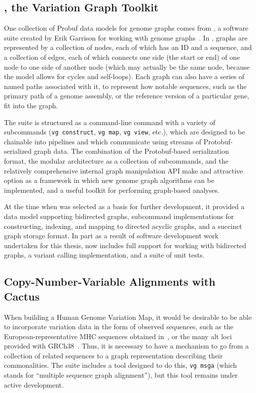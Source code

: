 \subsection{\vg, the Variation Graph Toolkit}


One collection of Probuf data models for genome graphs comes from \vg, a software suite created by Erik Garrison for working with genome graphs~\cite{garrison2016vg}. In \vg, graphs are represented by a collection of nodes, each of which has an ID and a sequence, and a collection of edges, each of which connects one side (the start or end) of one node to one side of another node (which may actually be the same node, because the \vg model allows for cycles and self-loops). Each graph can also have a series of named paths associated with it, to represent how notable sequences, such as the primary path of a genome assembly, or the reference version of a particular gene, fit into the graph.

The \vg suite is structured as a command-line \vg command with a variety of subcommands (\texttt{vg construct}, \texttt{vg map}, \texttt{vg view}, etc.), which are designed to be chainable into pipelines and which communicate using streams of Protobuf-serialized graph data. The combination of the Protobuf-based serialization format, the modular architecture as a collection of subcommands, and the relatively comprehensive internal graph manipulation API make \vg and attractive option as a framework in which new genome graph algorithms can be implemented, and a useful toolkit for performing graph-based analyses.

At the time when \vg was selected as a basis for further development, it provided a data model supporting bidirected graphs, subcommand implementations for constructing, indexing, and mapping to directed acyclic graphs, and a succinct graph storage format. In part as a result of software development work undertaken for this thesis, \vg now includes full support for working with bidirected graphs, a variant calling implementation, and a suite of unit tests.

\subsection{Copy-Number-Variable Alignments with Cactus}

When building a Human Genome Variation Map, it would be desirable to be able to incorporate variation data in the form of observed sequences, such as the European-representative MHC sequences obtained in~\citet{horton2008variation}, or the many alt loci provided with GRCh38~\cite{karolchik2014new}. Thus, it is necessary to have a mechanism to go from a collection of related sequences to a graph representation describing their commonalities. The \vg suite includes a tool designed to do this, \texttt{vg msga} (which stands for ``multiple sequence graph alignment''), but this tool remains under active development.

